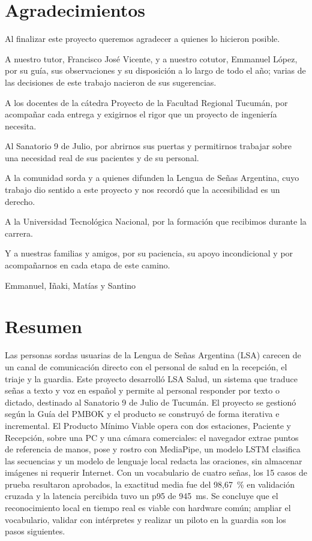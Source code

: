 \chapter*{Agradecimientos}
Al finalizar este proyecto queremos agradecer a quienes lo hicieron posible.

A nuestro tutor, Francisco José Vicente, y a nuestro cotutor, Emmanuel López, por su guía, sus observaciones y su disposición a lo largo de todo el año; varias de las decisiones de este trabajo nacieron de sus sugerencias.

A los docentes de la cátedra Proyecto de la Facultad Regional Tucumán, por acompañar cada entrega y exigirnos el rigor que un proyecto de ingeniería necesita.

Al Sanatorio 9 de Julio, por abrirnos sus puertas y permitirnos trabajar sobre una necesidad real de sus pacientes y de su personal.

A la comunidad sorda y a quienes difunden la Lengua de Señas Argentina, cuyo trabajo dio sentido a este proyecto y nos recordó que la accesibilidad es un derecho.

A la Universidad Tecnológica Nacional, por la formación que recibimos durante la carrera.

Y a nuestras familias y amigos, por su paciencia, su apoyo incondicional y por acompañarnos en cada etapa de este camino.

\bigskip
\begin{flushright}
Emmanuel, Iñaki, Matías y Santino
\end{flushright}

\chapter*{Resumen}
Las personas sordas usuarias de la Lengua de Señas Argentina (LSA) carecen de un canal de comunicación directo con el personal de salud en la recepción, el triaje y la guardia. Este proyecto desarrolló LSA Salud, un sistema que traduce señas a texto y voz en español y permite al personal responder por texto o dictado, destinado al Sanatorio 9 de Julio de Tucumán. El proyecto se gestionó según la Guía del PMBOK y el producto se construyó de forma iterativa e incremental. El Producto Mínimo Viable opera con dos estaciones, Paciente y Recepción, sobre una PC y una cámara comerciales: el navegador extrae puntos de referencia de manos, pose y rostro con MediaPipe, un modelo LSTM clasifica las secuencias y un modelo de lenguaje local redacta las oraciones, sin almacenar imágenes ni requerir Internet. Con un vocabulario de cuatro señas, los 15 casos de prueba resultaron aprobados, la exactitud media fue del 98,67~\% en validación cruzada y la latencia percibida tuvo un p95 de 945~ms. Se concluye que el reconocimiento local en tiempo real es viable con hardware común; ampliar el vocabulario, validar con intérpretes y realizar un piloto en la guardia son los pasos siguientes.

